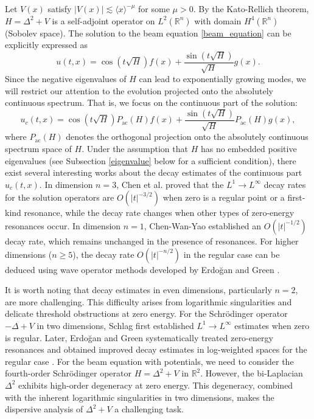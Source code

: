 \documentclass[reqno]{amsart}
\numberwithin{equation}{section}
\begin{document}
    
Let $V(x)$ satisfy $ |V(x)| \lesssim \langle x \rangle^{-\mu}$ for some $\mu > 0$. By the Kato-Rellich theorem, $H=\Delta^2+V$ is a self-adjoint operator on $L^2(\mathbb{R}^n)$ with domain $H^4(\mathbb{R}^n)$ (Sobolev space). The solution to the beam equation \eqref{beam_equation} can be explicitly expressed as
\[
	u(t, x) = \cos (t \sqrt{H }) f(x) + \frac{\sin (t \sqrt{H })}{\sqrt{H}} g(x).
\]
Since the negative eigenvalues of $H$ can lead to exponentially growing modes, we will restrict our attention to the evolution projected onto the absolutely continuous spectrum. That is, we focus on the continuous part of the solution:
\[
	u_c(t, x) = \cos (t \sqrt{H })P_{\mathrm{ac}}(H) f(x) + \frac{\sin (t \sqrt{H })}{\sqrt{H}} P_{\mathrm{ac}}(H) g(x),
\]
where $P_{\mathrm{ac}}(H)$ denotes the orthogonal projection onto the absolutely continuous spectrum space of $H$. Under the assumption that $H$ has no embedded positive eigenvalues (see Subsection \ref{eigenvalue} below for a sufficient condition), there exist several interesting works about the decay estimates of the continuous part $u_{c}(t, x)$.
 In dimension $n=3$, Chen et al. \cite{CLSY_ArXiv} proved that the $L^1 \to L^\infty$ decay rates for the solution operators are ${O}(|t|^{-3/2})$ when zero is a regular point or a first-kind resonance, while the decay rate changes when other types of zero-energy resonances occur. In dimension $n=1$, Chen-Wan-Yao \cite{CWY} established an $O(|t|^{-1/2})$ decay rate, which remains unchanged  in the presence of resonances. For higher dimensions ($n\geq5$), the decay rate $O(|t|^{-n/2})$ in the regular case can be deduced using wave operator methods developed by Erdo\u{g}an and Green \cite{EG21,Erdogan-Green23}.

It is worth noting that decay estimates in even dimensions, particularly $n=2$, are more challenging. This difficulty arises from logarithmic singularities and delicate threshold obstructions at zero energy. For the Schr\"odinger operator $-\Delta+V$ in two dimensions, Schlag \cite{Schlag-2005} first established $L^1\to L^\infty$ estimates when zero is regular. Later, Erdo\u{g}an and Green \cite{Erdogan-Green} systematically treated zero-energy resonances and obtained improved decay estimates in log-weighted spaces for the regular case \cite{EG-2013}.
For the beam equation with potentials, we need to consider the fourth-order Schr\"odinger operator $H=\Delta^2+V$ in $\mathbb{R}^2$. However, the bi-Laplacian $\Delta^2$ exhibits high-order degeneracy at zero energy. This degeneracy, combined with the inherent logarithmic singularities in two dimensions, makes the dispersive analysis of $\Delta^2+V$ a challenging task.
\end{document}

